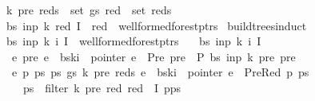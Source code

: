 \begin{isabellebody}
\ \ \ {\isachardoublequoteopen}{\isacharparenleft}{\kern0pt}{\isacharparenleft}{\kern0pt}k{\isacharprime}{\kern0pt}{\isacharcomma}{\kern0pt}\ pre{\isacharparenright}{\kern0pt}{\isacharcomma}{\kern0pt}\ reds{\isacharparenright}{\kern0pt}\ {\isasymin}\ set\ gs{\isachardoublequoteclose}\ {\isachardoublequoteopen}red\ {\isasymin}\ set\ reds{\isachardoublequoteclose}\isanewline
\ \ \ {\isachardoublequoteopen}{\isacharparenleft}{\kern0pt}bs{\isacharcomma}{\kern0pt}\ inp{\isacharcomma}{\kern0pt}\ k{\isacharcomma}{\kern0pt}\ red{\isacharcomma}{\kern0pt}\ I\ {\isasymunion}\ {\isacharbraceleft}{\kern0pt}red{\isacharbraceright}{\kern0pt}{\isacharparenright}{\kern0pt}\ {\isasymin}\ wellformed{\isacharunderscore}{\kern0pt}forest{\isacharunderscore}{\kern0pt}ptrs{\isachardoublequoteclose}%
\isadelimproof
%
\endisadelimproof
%
\isatagproof
%
\endisatagproof
{\isafoldproof}%
%
\isadelimproof
\isanewline
%
\endisadelimproof
{}\isamarkupfalse%
\ build{\isacharunderscore}{\kern0pt}trees{\isacharprime}{\kern0pt}{\isacharunderscore}{\kern0pt}induct{\isacharcolon}{\kern0pt}\isanewline
\ \ \ {\isachardoublequoteopen}{\isacharparenleft}{\kern0pt}bs{\isacharcomma}{\kern0pt}\ inp{\isacharcomma}{\kern0pt}\ k{\isacharcomma}{\kern0pt}\ i{\isacharcomma}{\kern0pt}\ I{\isacharparenright}{\kern0pt}\ {\isasymin}\ wellformed{\isacharunderscore}{\kern0pt}forest{\isacharunderscore}{\kern0pt}ptrs{\isachardoublequoteclose}\isanewline
\ \ \ {\isachardoublequoteopen}{\isasymAnd}bs\ inp\ k\ i\ I{\isachardot}{\kern0pt}\isanewline
\ \ \ \ {\isacharparenleft}{\kern0pt}{\isasymAnd}e\ pre{\isachardot}{\kern0pt}\ e\ {\isacharequal}{\kern0pt}\ bs{\isacharbang}{\kern0pt}k{\isacharbang}{\kern0pt}i\ {\isasymLongrightarrow}\ pointer\ e\ {\isacharequal}{\kern0pt}\ Pre\ pre\ {\isasymLongrightarrow}\ P\ bs\ inp\ {\isacharparenleft}{\kern0pt}k{\isacharminus}{\kern0pt}{}{\isacharparenright}{\kern0pt}\ pre\ {\isacharbraceleft}{\kern0pt}pre{\isacharbraceright}{\kern0pt}{\isacharparenright}{\kern0pt}\ {\isasymLongrightarrow}\isanewline
\ \ \ \ {\isacharparenleft}{\kern0pt}{\isasymAnd}e\ p\ ps\ ps{\isacharprime}{\kern0pt}\ gs\ k{\isacharprime}{\kern0pt}\ pre\ reds{\isachardot}{\kern0pt}\ e\ {\isacharequal}{\kern0pt}\ bs{\isacharbang}{\kern0pt}k{\isacharbang}{\kern0pt}i\ {\isasymLongrightarrow}\ pointer\ e\ {\isacharequal}{\kern0pt}\ PreRed\ p\ ps\ {\isasymLongrightarrow}\isanewline
\ \ \ \ \ \ ps{\isacharprime}{\kern0pt}\ {\isacharequal}{\kern0pt}\ filter\ {\isacharparenleft}{\kern0pt}{\isasymlambda}{\isacharparenleft}{\kern0pt}k{\isacharprime}{\kern0pt}{\isacharcomma}{\kern0pt}\ pre{\isacharcomma}{\kern0pt}\ red{\isacharparenright}{\kern0pt}{\isachardot}{\kern0pt}\ red\ {\isasymnotin}\ I{\isacharparenright}{\kern0pt}\ {\isacharparenleft}{\kern0pt}p{\isacharhash}{\kern0pt}ps{\isacharparenright}{\kern0pt}\ {\isasymLongrightarrow}\isanewline

\end{isabellebody}
